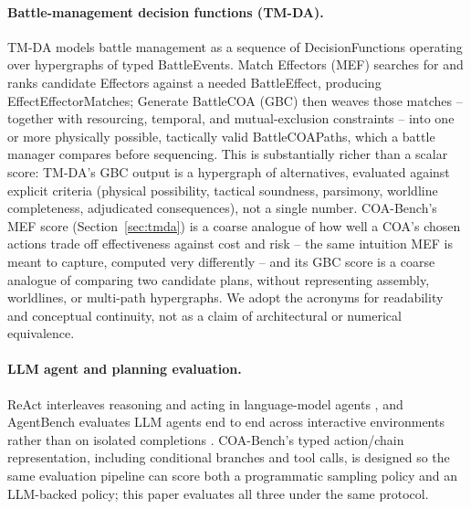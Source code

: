 \documentclass[letterpaper]{article} %
\begin{document}
\paragraph{Battle-management decision functions (TM-DA).} TM-DA \citep{tmda2025bootcamp} models battle management as a sequence of DecisionFunctions operating over hypergraphs of typed BattleEvents. Match Effectors (MEF) searches for and ranks candidate Effectors against a needed BattleEffect, producing EffectEffectorMatches; Generate BattleCOA (GBC) then weaves those matches -- together with resourcing, temporal, and mutual-exclusion constraints -- into one or more physically possible, tactically valid BattleCOAPaths, which a battle manager compares before sequencing. This is substantially richer than a scalar score: TM-DA's GBC output is a hypergraph of alternatives, evaluated against explicit criteria (physical possibility, tactical soundness, parsimony, worldline completeness, adjudicated consequences), not a single number. COA-Bench's MEF score (Section~\ref{sec:tmda}) is a coarse analogue of how well a COA's chosen actions trade off effectiveness against cost and risk -- the same intuition MEF is meant to capture, computed very differently -- and its GBC score is a coarse analogue of comparing two candidate plans, without representing assembly, worldlines, or multi-path hypergraphs. We adopt the acronyms for readability and conceptual continuity, not as a claim of architectural or numerical equivalence.

\paragraph{LLM agent and planning evaluation.} ReAct interleaves reasoning and acting in language-model agents \citep{yao2023react}, and AgentBench evaluates LLM agents end to end across interactive environments rather than on isolated completions \citep{liu2024agentbench}. COA-Bench's typed action/chain representation, including conditional branches and tool calls, is designed so the same evaluation pipeline can score both a programmatic sampling policy and an LLM-backed policy; this paper evaluates all three under the same protocol.
\end{document}
